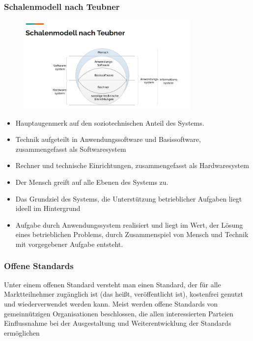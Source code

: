 \subsubsection{Schalenmodell nach Teubner}
\begin{figure}[htp]
\begin{center}
  \includegraphics[width=0.8\textwidth]{assets/SchalenmodellTeubner.PNG}
\end{center}
\end{figure}
\begin{itemize}
  \item Hauptaugenmerk auf den soziotechnischen Anteil des Systems.
  \item Technik aufgeteilt in Anwendungssoftware und Basissoftware, zusammengefasst als Softwaresystem
  \item Rechner und technische Einrichtungen, zusammengefasst als Hardwaresystem
  \item Der Mensch greift auf alle Ebenen des Systems zu.
  \item Das Grundziel des Systems, die Unterstützung betrieblicher Aufgaben liegt ideell im Hintergrund
  \item Aufgabe durch Anwendungssystem realisiert und liegt im Wert, der Lösung eines betrieblichen Problems, durch Zusammenspiel von Mensch und Technik mit vorgegebener Aufgabe entsteht.
\end{itemize}

\subsubsection{Offene Standards}
Unter einem offenen Standard versteht man einen Standard, der für alle Marktteilnehmer zugänglich ist (das heißt, veröffentlicht ist), kostenfrei genutzt und wiederverwendet werden kann. Meist werden offene Standards von gemeinnützigen Organisationen beschlossen, die allen interessierten Parteien Einflussnahme bei der Ausgestaltung und Weiterentwicklung der Standards ermöglichen

